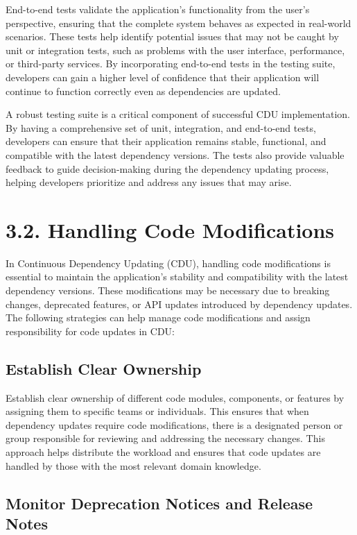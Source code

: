 \documentclass[10pt]{article}
\begin{document}
End-to-end tests validate the application's functionality from the user's perspective, ensuring that the complete system behaves as expected in real-world scenarios. These tests help identify potential issues that may not be caught by unit or integration tests, such as problems with the user interface, performance, or third-party services. By incorporating end-to-end tests in the testing suite, developers can gain a higher level of confidence that their application will continue to function correctly even as dependencies are updated.

A robust testing suite is a critical component of successful CDU implementation. By having a comprehensive set of unit, integration, and end-to-end tests, developers can ensure that their application remains stable, functional, and compatible with the latest dependency versions. The tests also provide valuable feedback to guide decision-making during the dependency updating process, helping developers prioritize and address any issues that may arise.

\section*{3.2. Handling Code Modifications}

In Continuous Dependency Updating (CDU), handling code modifications is essential to maintain the application's stability and compatibility with the latest dependency versions. These modifications may be necessary due to breaking changes, deprecated features, or API updates introduced by dependency updates. The following strategies can help manage code modifications and assign responsibility for code updates in CDU:

\subsection*{Establish Clear Ownership}

Establish clear ownership of different code modules, components, or features by assigning them to specific teams or individuals. This ensures that when dependency updates require code modifications, there is a designated person or group responsible for reviewing and addressing the necessary changes. This approach helps distribute the workload and ensures that code updates are handled by those with the most relevant domain knowledge.

\subsection*{Monitor Deprecation Notices and Release Notes}
\end{document}
